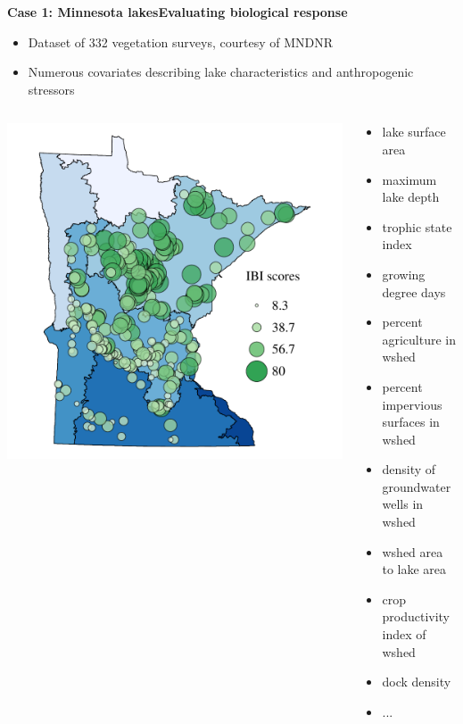 \documentclass[serif]{beamer}\usepackage[]{graphicx}\usepackage[]{color}
\begin{document}
\begin{frame}{\textbf{Case 1: Minnesota lakes}}{\textbf{Evaluating biological response}}
\begin{itemize}
\item Dataset of 332 vegetation surveys, courtesy of MNDNR
\item Numerous covariates describing lake characteristics and anthropogenic stressors
\end{itemize}
\begin{columns}
\begin{column}{0.5\textwidth}
\centerline{\includegraphics[width=\textwidth]{fig/Beck_GEDsem-ibi_data.pdf}}
\end{column}
\begin{column}{0.5\textwidth}
\scriptsize
\begin{itemize}
\item{lake surface area}
\item{maximum lake depth}
\item{trophic state index}
\item{growing degree days}
\item{percent agriculture in wshed}
\item{percent impervious surfaces in wshed}
\item{density of groundwater wells in wshed}
\item{wshed area to lake area}
\item{crop productivity index of wshed}
\item{dock density}
\item{...}
\end{itemize}
\end{column}
\end{columns}
\end{frame}
\end{document}
